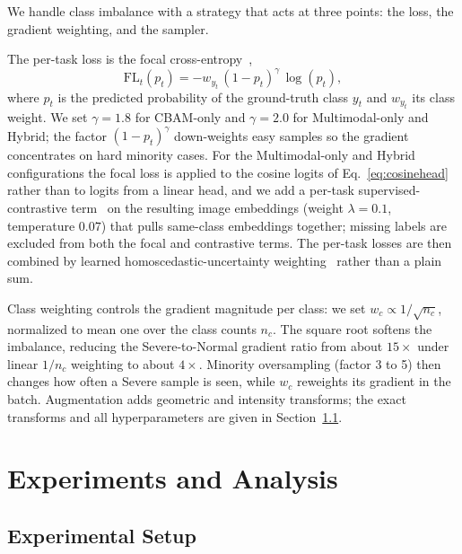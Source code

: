 \documentclass[runningheads]{llncs}
\begin{document}
We handle class imbalance with a strategy that acts at three points: the loss, the gradient weighting, and the sampler.

The per-task loss is the focal cross-entropy~\cite{lin2017focal},
\begin{equation}
\mathrm{FL}_t(p_t) = -w_{y_t}\,(1 - p_t)^{\gamma}\, \log(p_t),
\label{eq:focal}
\end{equation}
where $p_t$ is the predicted probability of the ground-truth class $y_t$ and $w_{y_t}$ its class weight. We set $\gamma=1.8$ for CBAM-only and $\gamma=2.0$ for Multimodal-only and Hybrid; the factor $(1 - p_t)^{\gamma}$ down-weights easy samples so the gradient concentrates on hard minority cases. For the Multimodal-only and Hybrid configurations the focal loss is applied to the cosine logits of Eq.~\ref{eq:cosinehead} rather than to logits from a linear head, and we add a per-task supervised-contrastive term~\cite{khosla2020supcon} on the resulting image embeddings (weight $\lambda=0.1$, temperature $0.07$) that pulls same-class embeddings together; missing labels are excluded from both the focal and contrastive terms. The per-task losses are then combined by learned homoscedastic-uncertainty weighting~\cite{kendall2018multitask} rather than a plain sum.

Class weighting controls the gradient magnitude per class: we set $w_c \propto 1/\sqrt{n_c}$, normalized to mean one over the class counts $n_c$. The square root softens the imbalance, reducing the Severe-to-Normal gradient ratio from about $15\times$ under linear $1/n_c$ weighting to about $4\times$. Minority oversampling (factor 3 to 5) then changes how often a Severe sample is seen, while $w_c$ reweights its gradient in the batch. Augmentation adds geometric and intensity transforms; the exact transforms and all hyperparameters are given in Section~\ref{exp1}.

\section{Experiments and Analysis}\label{sec4}

\subsection{Experimental Setup}\label{exp1}
\end{document}
